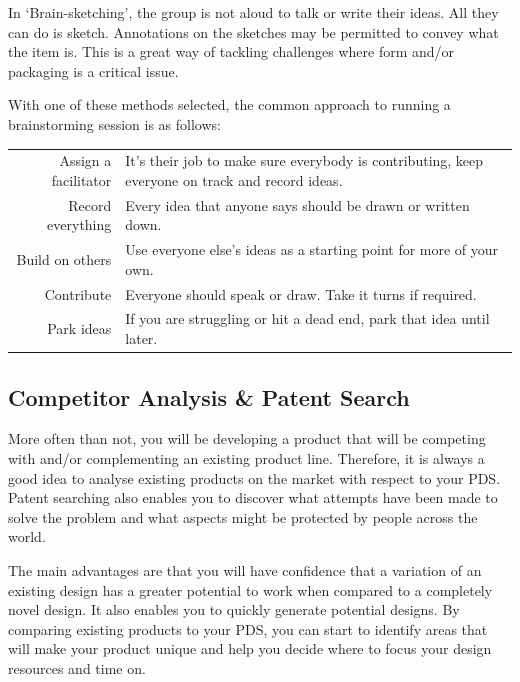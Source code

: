 In `Brain-sketching', the group is not aloud to talk or write their ideas. All they can do is sketch. Annotations on the sketches may be permitted to convey what the item is. This is a great way of tackling challenges where form and/or packaging is a critical issue. 

With one of these methods selected, the common approach to running a brainstorming session is as follows:

\begin{table}
    \small
    \begin{tabular}{r p{}}
        Assign a facilitator & It's their job to make sure everybody is contributing, keep everyone on track and record ideas. \\
        Record everything & Every idea that anyone says should be drawn or written down. \\
        Build on others & Use everyone else's ideas as a starting point for more of your own. \\
        Contribute & Everyone should speak or draw.  Take it turns if required. \\
        Park ideas & If you are struggling or hit a dead end, park that idea until later. \\
    \end{tabular}
\end{table}

\subsection{Competitor Analysis \& Patent Search}

More often than not, you will be developing a product that will be competing with and/or complementing an existing product line. Therefore, it is always a good idea to analyse existing products on the market with respect to your \ac{PDS}.  Patent searching also enables you to discover what attempts have been made to solve the problem and what aspects might be protected by people across the world.

The main advantages are that you will have confidence that a variation of an existing design has a greater potential to work when compared to a completely novel design. It also enables you to quickly generate potential designs. By comparing existing products to your PDS, you can start to identify areas that will make your product unique and help you decide where to focus your design resources and time on.

